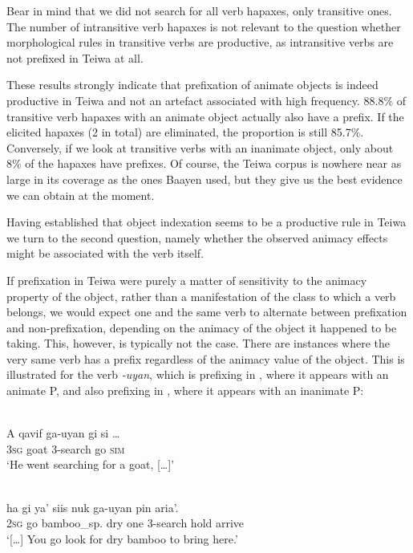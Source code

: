 Bear in mind that we did not search for all verb hapaxes, only transitive ones. The number of intransitive verb hapaxes is not relevant to the question whether morphological rules in transitive verbs are productive, as intransitive verbs are not prefixed in Teiwa at all.

These results strongly indicate that prefixation of animate objects is indeed productive in Teiwa and not an artefact associated with high frequency. 88.8\% of transitive verb hapaxes with an animate object actually also have a prefix. If the elicited hapaxes (2 in total) are eliminated, the proportion is still 85.7\%. Conversely, if we look at transitive verbs with an inanimate object, only about 8\% of the hapaxes have prefixes. Of course, the Teiwa corpus is nowhere near as large in its coverage as the ones Baayen used, but they give us the best evidence we can obtain at the moment.

Having established that object indexation seems to be a productive rule in Teiwa we turn to the second question, namely whether the observed animacy effects might be associated with the verb itself. 

If prefixation in Teiwa were purely a matter of sensitivity to the animacy property of the object, rather than a manifestation of the class to which a verb belongs, we would expect one and the same verb to alternate between prefixation and non-prefixation, depending on the animacy of the object it happened to be taking. This, however, is typically not the case. There are instances where the very same verb has a prefix regardless of the animacy value of the object. This is illustrated for the verb \textit{-uyan}, which is prefixing in , where it appears with an animate P, and also prefixing in , where it appears with an inanimate P:


\ea 
\label{ex:10:1241}
 \\ 
 \gll    A  qavif    ga-uyan  gi  si  \dots\\
    3\textsc{sg} goat  3-search  go  \textsc{sim} \\
 \glt `He went searching for a goat, [{\dots}]'

\z



\ea 
\label{ex:10:1242}
 \\ 
 \gll   {\dots}  ha        gi    ya'          siis nuk  ga-uyan   pin   aria'.\\
        {}  2\textsc{sg} go    bamboo\_sp.  dry  one  3-search  hold  arrive \\
 \glt `[{\dots}] You go look for dry bamboo to bring here.'   
\z


